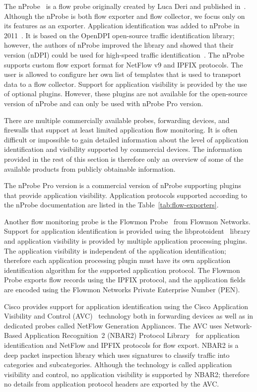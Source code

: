 The nProbe~\cite{Deri-2003-nProbe} is a flow probe originally created by Luca Deri and published in~\citeyear{Deri-2003-nProbe}. Although the nProbe is both flow exporter and flow collector, we focus only on its features as an exporter. Application identification was added to nProbe in 2011~\cite{ntop-2011-Unveiling}. It is based on the OpenDPI open-source traffic identification library; however, the authors of nProbe improved the library and showed that their version (nDPI) could be used for high-speed traffic identification~\cite{Deri-2014-nDPI}. The nProbe supports custom flow export format for NetFlow v9 and IPFIX protocols. The user is allowed to configure her own list of templates that is used to transport data to a flow collector. Support for application visibility is provided by the use of optional plugins. However, these plugins are not available for the open-source version of nProbe and can only be used with nProbe Pro version.

There are multiple commercially available probes, forwarding devices, and firewalls that support at least limited application flow monitoring. It is often difficult or impossible to gain detailed information about the level of application identification and visibility supported by commercial devices. The information provided in the rest of this section is therefore only an overview of some of the available products from publicly obtainable information.

The nProbe Pro version is a commercial version of nProbe supporting plugins that provide application visibility. Application protocols supported according to the nProbe documentation are listed in the Table~\ref{tab:flow-exporters}.

Another flow monitoring probe is the Flowmon Probe~\cite{FlowmonNetworks--Flowmon} from Flowmon Networks. Support for application identification is provided using the libprotoident~\cite{Alcock-2012-libprotoident} library and application visibility is provided by multiple application processing plugins. The application visibility is independent of the application identification; therefore each application processing plugin must have its own application identification algorithm for the supported application protocol. The Flowmon Probe exports flow records using the IPFIX protocol, and the application fields are encoded using the Flowmon Networks Private Enterprise Number (PEN).

Cisco provides support for application identification using the Cisco Application Visibility and Control (AVC)~\cite{CiscoSystems--Cisco} technology both in forwarding devices as well as in dedicated probes called NetFlow Generation Appliances. The AVC uses Network-Based Application Recognition~2 (NBAR2) Protocol Library~\cite{CiscoSystems--NBAR2} for application identification and NetFlow and IPFIX protocols for flow export. NBAR2 is a deep packet inspection library which uses signatures to classify traffic into categories and subcategories. Although the technology is called application visibility and control, no application visibility is supported by NBAR2; therefore no details from application protocol headers are exported by the AVC. 

